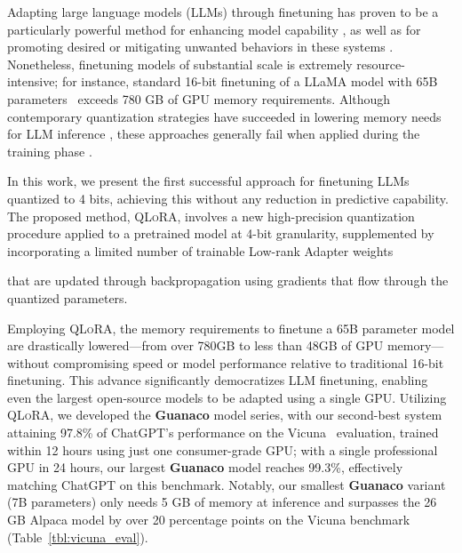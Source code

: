 Adapting large language models (LLMs) through finetuning has proven to be a particularly powerful method for enhancing model capability \citep{min2021metaicl, wei2021finetuned, ouyang2022training, wang2022super, wang2022self, liu2022few}, as well as for promoting desired or mitigating unwanted behaviors in these systems \citep{ouyang2022training,askell2021general,bai2022training}. Nonetheless, finetuning models of substantial scale is extremely resource-intensive; for instance, standard 16-bit finetuning of a LLaMA model with 65B parameters~\citep{touvron2023llama} exceeds 780 GB of GPU memory requirements. Although contemporary quantization strategies have succeeded in lowering memory needs for LLM inference \citep{dettmers2022llm, dettmers2022case, frantar2022gptq, xiao2022smoothquant}, these approaches generally fail when applied during the training phase \citep{wortsman2023stable}.

In this work, we present the first successful approach for finetuning LLMs quantized to 4 bits, achieving this without any reduction in predictive capability. The proposed method, \textsc{QLoRA}, involves a new high-precision quantization procedure applied to a pretrained model at 4-bit granularity, supplemented by incorporating a limited number of trainable Low-rank Adapter weights \citep{hu2021lora} 

that are updated through backpropagation using gradients that flow through the quantized parameters.

Employing \textsc{QLoRA}, the memory requirements to finetune a 65B parameter model are drastically lowered—from over 780GB to less than 48GB of GPU memory—without compromising speed or model performance relative to traditional 16-bit finetuning. This advance significantly democratizes LLM finetuning, enabling even the largest open-source models to be adapted using a single GPU. Utilizing \textsc{QLoRA}, we developed the \textbf{Guanaco} model series, with our second-best system attaining 97.8\% of ChatGPT's performance on the Vicuna~\citep{vicuna2023} evaluation, trained within 12 hours using just one consumer-grade GPU; with a single professional GPU in 24 hours, our largest \textbf{Guanaco} model reaches 99.3\%, effectively matching ChatGPT on this benchmark. Notably, our smallest \textbf{Guanaco} variant (7B parameters) only needs 5 GB of memory at inference and surpasses the 26 GB Alpaca model by over 20 percentage points on the Vicuna benchmark (Table~\ref{tbl:vicuna_eval}).

